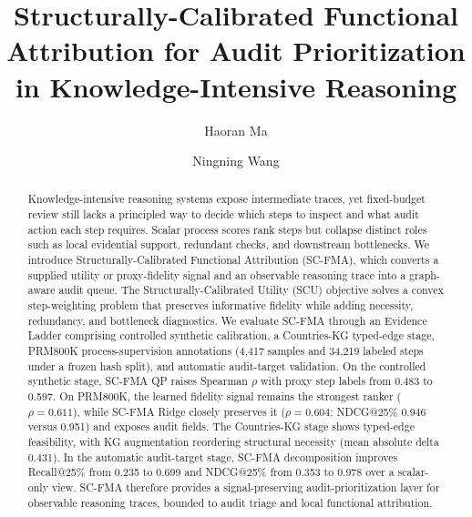 \documentclass[a4paper,fleqn]{cas-sc}
\begin{document}
\let\WriteBookmarks\relax
\def\floatpagepagefraction{1}
\def\textpagefraction{.001}


\title[mode=title]{Structurally-Calibrated Functional Attribution for Audit Prioritization in Knowledge-Intensive Reasoning}

\author[1]{Haoran Ma}

\author[1,2]{Ningning Wang}

\renewcommand{\printorcid}{}



\begin{abstract}
Knowledge-intensive reasoning systems expose intermediate traces, yet fixed-budget review still lacks a principled way to decide which steps to inspect and what audit action each step requires. Scalar process scores rank steps but collapse distinct roles such as local evidential support, redundant checks, and downstream bottlenecks. We introduce Structurally-Calibrated Functional Attribution (SC-FMA), which converts a supplied utility or proxy-fidelity signal and an observable reasoning trace into a graph-aware audit queue. The Structurally-Calibrated Utility (SCU) objective solves a convex step-weighting problem that preserves informative fidelity while adding necessity, redundancy, and bottleneck diagnostics. We evaluate SC-FMA through an Evidence Ladder comprising controlled synthetic calibration, a Countries-KG typed-edge stage, PRM800K process-supervision annotations (4,417 samples and 34,219 labeled steps under a frozen hash split), and automatic audit-target validation. On the controlled synthetic stage, SC-FMA QP raises Spearman $\rho$ with proxy step labels from 0.483 to 0.597. On PRM800K, the learned fidelity signal remains the strongest ranker ($\rho=0.611$), while SC-FMA Ridge closely preserves it ($\rho=0.604$; NDCG@25\% 0.946 versus 0.951) and exposes audit fields. The Countries-KG stage shows typed-edge feasibility, with KG augmentation reordering structural necessity (mean absolute delta 0.431). In the automatic audit-target stage, SC-FMA decomposition improves Recall@25\% from 0.235 to 0.699 and NDCG@25\% from 0.353 to 0.978 over a scalar-only view. SC-FMA therefore provides a signal-preserving audit-prioritization layer for observable reasoning traces, bounded to audit triage and local functional attribution.
\end{abstract}
\end{document}
